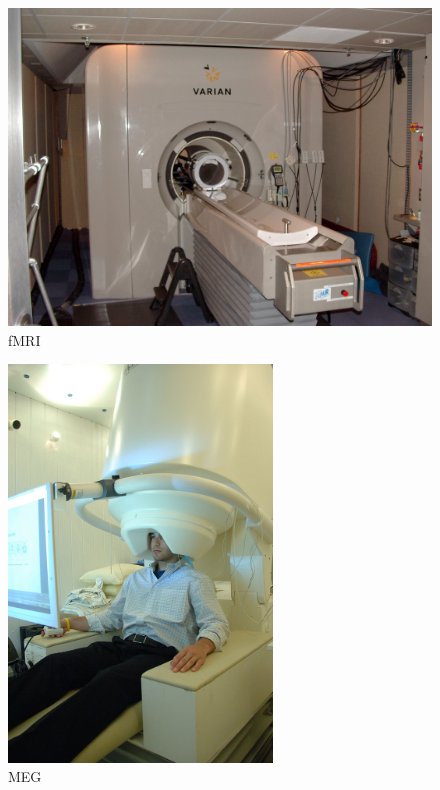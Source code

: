 \begin{figure}
    \begin{center}
    \includegraphics[width=140mm]{images/fMRI.jpg}
    \end{center}
    \caption{fMRI}
    \label{fig:fMRI}
\end{figure}
\begin{figure}
    \begin{center}
    \includegraphics[width=70mm]{images/MEG.jpg}
    \end{center}
    \caption{MEG}
    \label{fig:MEG}
\end{figure}

